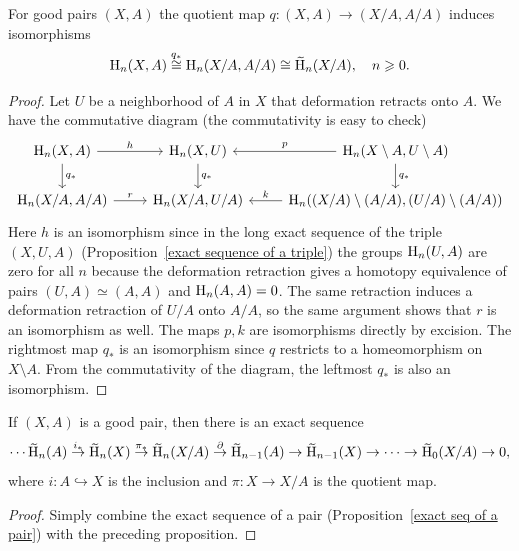 \begin{prop}
    For good pairs $(X,A)$ the quotient map $q:(X,A)\to (X/A,A/A)$ induces isomorphisms \[\rmH_n(X,A)\overset{q_\ast}\cong \rmH_n(X/A,A/A)\cong \wt{\rmH}_n(X/A),\quad n\geq 0.\]
\end{prop}
\begin{proof}
     Let $U$ be a neighborhood of $A$ in $X$ that deformation retracts onto $A$. We have the commutative diagram (the commutativity is easy to check)
      \[\begin{tikzcd}
        \rmH_n(X,A) \arrow[r,"h"]\arrow[d,"q_\ast"] & \rmH_n(X,U)\arrow[d,"q_\ast"]\ar[r,leftarrow,"p"] & \rmH_n(X\setminus A,U\setminus A)\arrow[d,"q_\ast"] \\
        \rmH_n(X/ A,A/A)\arrow[r,"r"] &\rmH_n(X/A,U/A) \ar[r,leftarrow,"k"] &\rmH_n((X/A)\setminus (A/A),(U/A)\setminus(A/A))
    \end{tikzcd}\]
    Here $h$ is an isomorphism since in the long exact sequence of the triple $(X,U,A)$ (Proposition~\ref{exact sequence of a triple}) the groups $\mathrm{H}_n(U,A)$ are zero for all $n$ because the deformation retraction gives a homotopy equivalence of pairs $(U,A)\simeq (A,A)$ and $\mathrm{H}_n(A,A)=0$. The same retraction induces a deformation retraction of $U/A$ onto $A/A$, so the same argument shows that $r$ is an isomorphism as well. The maps $p,k$ are isomorphisms directly by excision. The rightmost map $q_\ast$ is an isomorphism since $q$ restricts to a homeomorphism on $X\setminus A$. From the commutativity of the diagram, the leftmost $q_\ast$ is also an isomorphism.
\end{proof}

\begin{thm}
    If $(X,A)$ is a good pair, then there is an exact sequence
    \[\cdots \wt{\rmH}_n(A)\overset{i_\ast}\to \wt{\rmH}_n(X)\overset{\pi_\ast}\to \wt{\rmH}_n(X/A)\overset\partial\to \wt{\rmH}_{n-1}(A)\to \wt{\rmH}_{n-1}(X)\to \cdots \to \wt{\rmH}_0(X/A)\to 0,\]
    where $i:A\hookrightarrow X$ is the inclusion and $\pi:X\to X/A$ is the quotient map.
\end{thm}
\begin{proof}
     Simply combine the exact sequence of a pair (Proposition~\ref{exact seq of a pair}) with the preceding proposition.
\end{proof}


